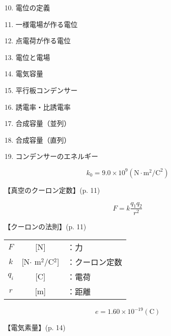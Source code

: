 \documentclass[10pt]{jarticle}
\begin{document}
\newpage
\addtocounter{page}{-1}
\thispagestyle{empty}

\vspace*{-10mm}
\begin{enumerate}
\setcounter{enumi}{9}
\small
\itemsep-4mm
\item 電位の定義 \\
\item 一様電場が作る電位 \\
\item 点電荷が作る電位 \\
\item 電位と電場 \\
\item 電気容量 \\
\item 平行板コンデンサー \\
\item 誘電率・比誘電率 \\
\item 合成容量（並列） \\
\item 合成容量（直列） \\
\item コンデンサーのエネルギー \\
\end{enumerate}




\newpage
\[
	k_0 = 9.0 \! \times \! 10^9  \mathrm{(N \! \cdot \! m^2/C^2)}
\]


\vskip3mm
\noindent
【真空のクーロン定数】{\footnotesize (p. 11)}




\newpage
\[
F = k \frac{q_1 q_2}{r^2}
\]


\vskip3mm
\noindent
【クーロンの法則】{\footnotesize (p. 11)}

\begin{tabular}{ccl}
$F$	&[N]	&：力 \\
$k$	&{\small [N$\cdot \!\!$ m$^2\!$/C$^2$]}	&：クーロン定数 \\
$q_i$	&[C]	&：電荷 \\
$r$	&[m]	&：距離
\end{tabular}




\newpage
\[
e = 1.60 \! \times \! 10^{-19} \mathrm{(C)}
\]


\vskip3mm
\noindent
【電気素量】{\footnotesize (p. 14)}
\end{document}
